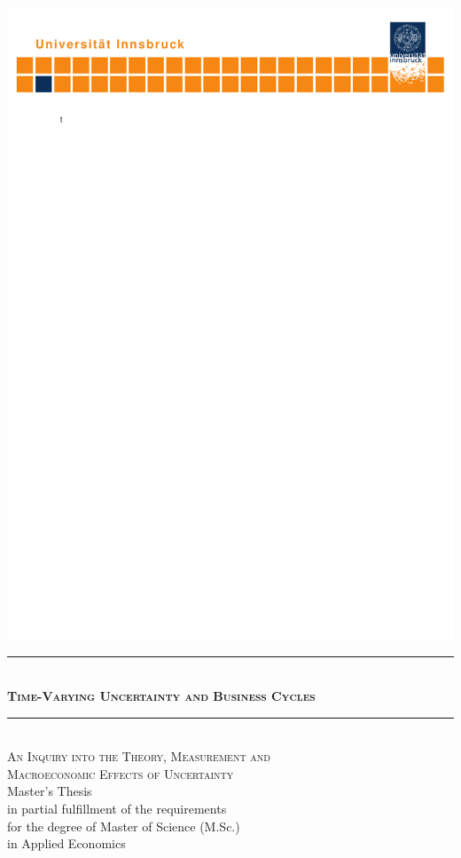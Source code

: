 \documentclass[a4paper,11pt,listof=nochaptergap,oneside,pointednumbers,bibtotoc,bigheadings,liststotoc]{scrbook}
\begin{document}
\begin{titlepage}
    \begin{center}
        \hspace*{-0.27\textwidth}\includegraphics[width=1.419\textwidth, trim = 5mm 250mm 0mm 0mm, clip = TRUE]{logo.pdf}\hspace*{-0.3\textwidth}
        \quad \\[0mm]
        \newcommand{\HRule}{\rule{\linewidth}{0.3mm}} %
        \HRule \\[-1mm]
        \Huge{\scshape\bfseries Time-Varying Uncertainty and Business Cycles} \\[-5mm]
        \HRule \\[2mm]
        \large {\scshape An Inquiry into the Theory, Measurement and \\
        				Macroeconomic Effects of Uncertainty} \\[10mm]
        \large Master's Thesis \\[10mm]
        \large in partial fulfillment of the requirements \\for the degree of Master of Science (M.Sc.)\\
                  in Applied Economics \\[10mm]
                  

\end{center}
\end{titlepage}
\end{document}
